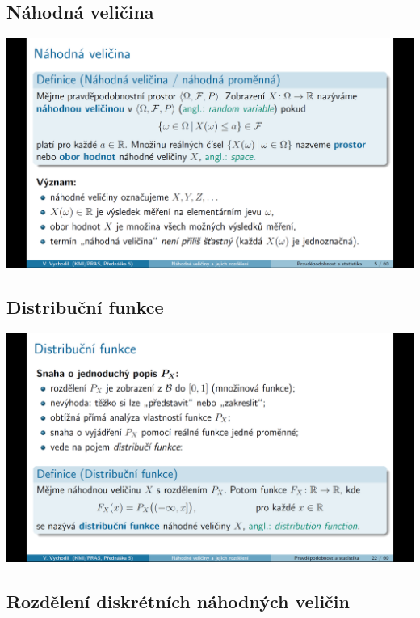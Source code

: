 \documentclass[12pt,a4paper]{article}
\begin{document}
\subsection{Náhodná veličina}
\begin{center}
	\includegraphics[scale=0.32]{img/nahod_velicina}
\end{center}

\subsection{Distribuční funkce}
\begin{center}
	\includegraphics[scale=0.32]{img/distribucni_fce}
\end{center}

\subsection{Rozdělení diskrétních náhodných veličin}
\end{document}
